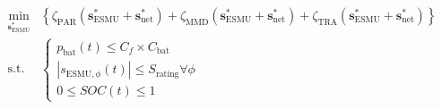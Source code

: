 \begin{equation}
\begin{split}
	\min_{\textbf{s}^*_\text{ESMU}} & \left\{\zeta_\text{PAR}(\textbf{s}^*_\text{ESMU}+\textbf{s}^*_\text{net}) + \zeta_\text{MMD}(\textbf{s}^*_\text{ESMU}+\textbf{s}^*_\text{net}) + \zeta_\text{TRA}(\textbf{s}^*_\text{ESMU}+\textbf{s}^*_\text{net})\right\}\\
	\text{s.t. }& \begin{cases}
		p_\text{bat}(t) \leq C_f\times C_\text{bat}\\
		\left|s_{\text{ESMU},\phi}(t)\right| \leq S_\text{rating} \forall \phi\\
		0 \leq SOC(t) \leq 1
	\end{cases}
\end{split}
\label{ch1:equ:scheduling-cost}
\end{equation}